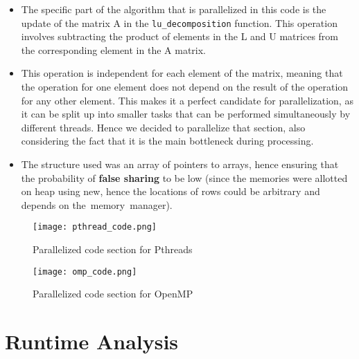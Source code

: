 \documentclass{article}
\begin{document}
\begin{itemize}
	\item The specific part of the algorithm that is parallelized in this code is the update of the matrix A in the \verb|lu_decomposition| function. This operation involves subtracting the product of elements in the L and U matrices from the corresponding element in the A matrix.
	\item This operation is independent for each element of the matrix, meaning that the operation for one element does not depend on the result of the operation for any other element. This makes it a perfect candidate for parallelization, as it can be split up into smaller tasks that can be performed simultaneously by different threads. Hence we decided to parallelize that section, also considering the fact that it is the main bottleneck during processing.
	\item The structure used was an array of pointers to arrays, hence ensuring that the probability of \textbf{false sharing} to be low (since the memories were allotted on heap using new, hence the locations of rows could be arbitrary and depends on the memory manager).
\end{itemize}

\begin{figure}[!htb]
    \centering
    \texttt{[image: pthread\_code.png]}
    \caption{Parallelized code section for Pthreads}
\end{figure}

\begin{figure}[!htb]
    \centering
    \texttt{[image: omp\_code.png]}
    \caption{Parallelized code section for OpenMP}
\end{figure}

\clearpage

\section{Runtime Analysis}
\end{document}
